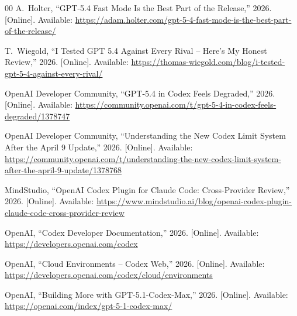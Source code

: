 \documentclass[conference]{IEEEtran}
\begin{document}
\begin{thebibliography}{00}
A.~Holter, ``GPT-5.4 Fast Mode Is the Best Part of the Release,'' 2026. [Online]. Available: \url{https://adam.holter.com/gpt-5-4-fast-mode-is-the-best-part-of-the-release/}

T.~Wiegold, ``I Tested GPT 5.4 Against Every Rival -- Here's My Honest Review,'' 2026. [Online]. Available: \url{https://thomas-wiegold.com/blog/i-tested-gpt-5-4-against-every-rival/}

OpenAI Developer Community, ``GPT-5.4 in Codex Feels Degraded,'' 2026. [Online]. Available: \url{https://community.openai.com/t/gpt-5-4-in-codex-feels-degraded/1378747}

OpenAI Developer Community, ``Understanding the New Codex Limit System After the April 9 Update,'' 2026. [Online]. Available: \url{https://community.openai.com/t/understanding-the-new-codex-limit-system-after-the-april-9-update/1378768}

MindStudio, ``OpenAI Codex Plugin for Claude Code: Cross-Provider Review,'' 2026. [Online]. Available: \url{https://www.mindstudio.ai/blog/openai-codex-plugin-claude-code-cross-provider-review}

OpenAI, ``Codex Developer Documentation,'' 2026. [Online]. Available: \url{https://developers.openai.com/codex}

OpenAI, ``Cloud Environments -- Codex Web,'' 2026. [Online]. Available: \url{https://developers.openai.com/codex/cloud/environments}

OpenAI, ``Building More with GPT-5.1-Codex-Max,'' 2026. [Online]. Available: \url{https://openai.com/index/gpt-5-1-codex-max/}

\end{thebibliography}
\end{document}
